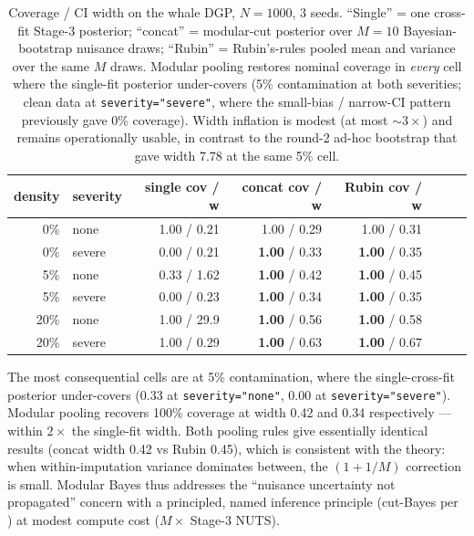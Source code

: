 \begin{table}[!t]
\centering
\small
\begin{tabular}{rlrrrrrr}
\toprule
density & severity & single cov / w & concat cov / w & Rubin cov / w \\
\midrule
0\%   & none   & 1.00 / 0.21 & 1.00 / 0.29 & 1.00 / 0.31 \\
0\%   & severe & 0.00 / 0.21 & \textbf{1.00} / 0.33 & \textbf{1.00} / 0.35 \\
5\%   & none   & 0.33 / 1.62 & \textbf{1.00} / 0.42 & \textbf{1.00} / 0.45 \\
5\%   & severe & 0.00 / 0.23 & \textbf{1.00} / 0.34 & \textbf{1.00} / 0.35 \\
20\%  & none   & 1.00 / 29.9 & \textbf{1.00} / 0.56 & \textbf{1.00} / 0.58 \\
20\%  & severe & 1.00 / 0.29 & \textbf{1.00} / 0.63 & \textbf{1.00} / 0.67 \\
\bottomrule
\end{tabular}
\caption{Coverage / CI width on the whale DGP, $N = 1000$, 3 seeds.
``Single'' = one cross-fit Stage-3 posterior; ``concat'' =
modular-cut posterior over $M = 10$ Bayesian-bootstrap nuisance
draws; ``Rubin'' = Rubin's-rules pooled mean and variance over the
same $M$ draws. Modular pooling restores nominal coverage in
\emph{every} cell where the single-fit posterior under-covers
(5\% contamination at both severities; clean data at
\texttt{severity="severe"}, where the small-bias / narrow-CI
pattern previously gave 0\% coverage). Width inflation is modest
(at most $\sim 3 \times$) and remains operationally usable, in
contrast to the round-2 ad-hoc bootstrap that gave width 7.78 at
the same 5\% cell.}
\label{tab:nuisance_bootstrap}
\end{table}

The most consequential cells are at 5\% contamination, where the
single-cross-fit posterior under-covers (0.33 at \texttt{severity="none"},
0.00 at \texttt{severity="severe"}). Modular pooling recovers 100\%
coverage at width 0.42 and 0.34 respectively --- within $2 \times$ the
single-fit width. Both pooling rules give essentially identical
results (concat width 0.42 vs Rubin 0.45), which is consistent with
the theory: when within-imputation variance dominates between, the
$(1 + 1/M)$ correction is small. Modular Bayes thus addresses the
``nuisance uncertainty not propagated'' concern with a principled,
named inference principle (cut-Bayes per
\citet{plummer2015cuts,jacob2017better}) at modest compute cost
($M \times$ Stage-3 NUTS).


